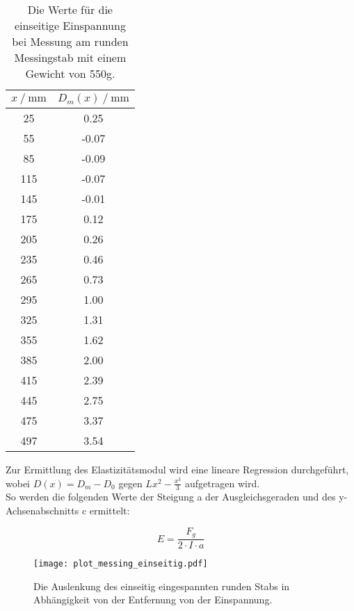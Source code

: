 \begin{table}[H]
  \centering
  \caption{Die Werte für die einseitige Einspannung bei Messung am runden Messingstab mit einem Gewicht von 550g.}
  \begin{tabular}{cc}
    \toprule
    {$x \mathbin{/} \unit{\milli\metre}$} &
    {$D_m(x) \mathbin{/} \unit{\milli\metre}$} \\
    \midrule
     25 &  0.25 \\
     55 & -0.07 \\
     85 & -0.09 \\
    115 & -0.07 \\
    145 & -0.01 \\
    175 & 0.12 \\
    205 & 0.26 \\ 
    235 & 0.46 \\
    265 & 0.73 \\
    295 & 1.00 \\
    325 & 1.31 \\
    355 & 1.62 \\
    385 & 2.00 \\
    415 & 2.39 \\
    445 & 2.75 \\
    475 & 3.37 \\
    497 & 3.54 \\
    
    \bottomrule
  \end{tabular}
  \label{tab:Tabelle2}
\end{table}

Zur Ermittlung des Elastizitätsmodul wird eine lineare Regression durchgeführt, wobei $D(x) = D_m - D_0$ gegen 
$Lx^2 - \frac{x^3}{3}$ aufgetragen wird.\\
So werden die folgenden Werte der Steigung a der Ausgleichsgeraden und des y-Achsenabschnitts c ermittelt:


\begin{equation*}
  E = \frac{F_g}{2 \cdot I \cdot a} %
\end{equation*}


\begin{figure}
  \centering
  \texttt{[image: plot\_messing\_einseitig.pdf]}
  \caption{Die Auslenkung des einseitig eingespannten runden Stabs in Abhängigkeit 
  von der Entfernung von der Einspannung.}
  \label{fig:plot_messing_einseitig}
\end{figure}

